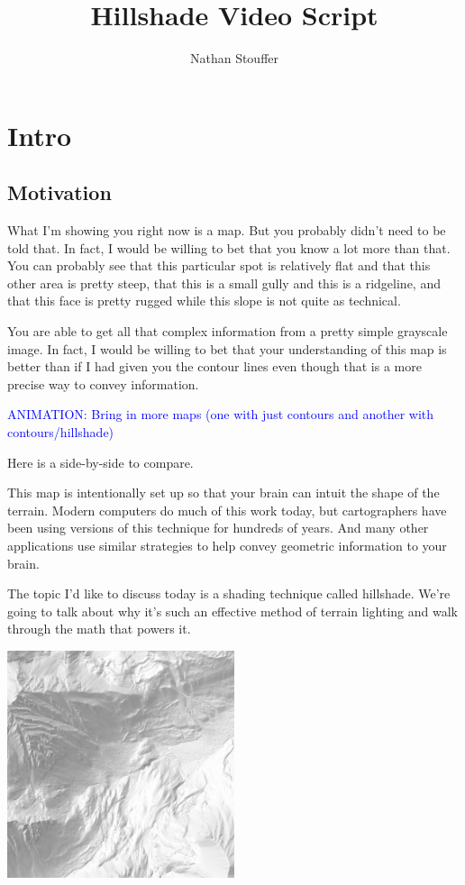 \documentclass{article}
\newcommand\animation[1]{\textcolor{blue}{ANIMATION: #1}}
\begin{document}
	
\title{Hillshade Video Script}
\author{Nathan Stouffer}
\date{}
\maketitle

\section{Intro}

\subsection{Motivation}

What I'm showing you right now is a map.
But you probably didn't need to be told that.
In fact, I would be willing to bet that you know a lot more than that.
You can probably see that this particular spot is relatively flat and that this other area is pretty steep, that this is a small gully and this is a ridgeline, and that this face is pretty rugged while this slope is not quite as technical.

You are able to get all that complex information from a pretty simple grayscale image.
In fact, I would be willing to bet that your understanding of this map is better than if I had given you the contour lines even though that is a more precise way to convey information.

\animation{Bring in more maps (one with just contours and another with contours/hillshade)}

Here is a side-by-side to compare.

This map is intentionally set up so that your brain can intuit the shape of the terrain.
Modern computers do much of this work today, but cartographers have been using versions of this technique for hundreds of years.
And many other applications use similar strategies to help convey geometric information to your brain.

The topic I'd like to discuss today is a shading technique called hillshade.
We're going to talk about why it's such an effective method of terrain lighting and walk through the math that powers it.

\begin{center}
	\includegraphics[width=0.5\textwidth,frame]{assets/hillshade-example.png}
\end{center}
\end{document}
